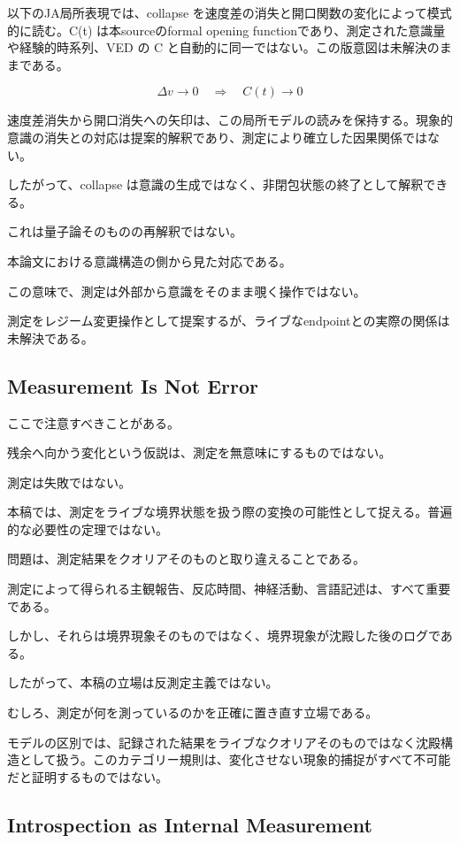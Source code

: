 以下のJA局所表現では、collapse を速度差の消失と開口関数の変化によって模式的に読む。C(t) は本sourceのformal opening functionであり、測定された意識量や経験的時系列、VED の C と自動的に同一ではない。この版意図は未解決のままである。

\begin{equation}
\Delta v \to 0
\quad \Rightarrow \quad
C(t) \to 0
\end{equation}

速度差消失から開口消失への矢印は、この局所モデルの読みを保持する。現象的意識の消失との対応は提案的解釈であり、測定により確立した因果関係ではない。

したがって、collapse は意識の生成ではなく、非閉包状態の終了として解釈できる。

これは量子論そのものの再解釈ではない。

本論文における意識構造の側から見た対応である。

この意味で、測定は外部から意識をそのまま覗く操作ではない。

測定をレジーム変更操作として提案するが、ライブなendpointとの実際の関係は未解決である。

\subsection{Measurement Is Not Error}

ここで注意すべきことがある。

残余へ向かう変化という仮説は、測定を無意味にするものではない。

測定は失敗ではない。

本稿では、測定をライブな境界状態を扱う際の変換の可能性として捉える。普遍的な必要性の定理ではない。

問題は、測定結果をクオリアそのものと取り違えることである。

測定によって得られる主観報告、反応時間、神経活動、言語記述は、すべて重要である。

しかし、それらは境界現象そのものではなく、境界現象が沈殿した後のログである。

したがって、本稿の立場は反測定主義ではない。

むしろ、測定が何を測っているのかを正確に置き直す立場である。

モデルの区別では、記録された結果をライブなクオリアそのものではなく沈殿構造として扱う。このカテゴリー規則は、変化させない現象的捕捉がすべて不可能だと証明するものではない。

\subsection{Introspection as Internal Measurement}

